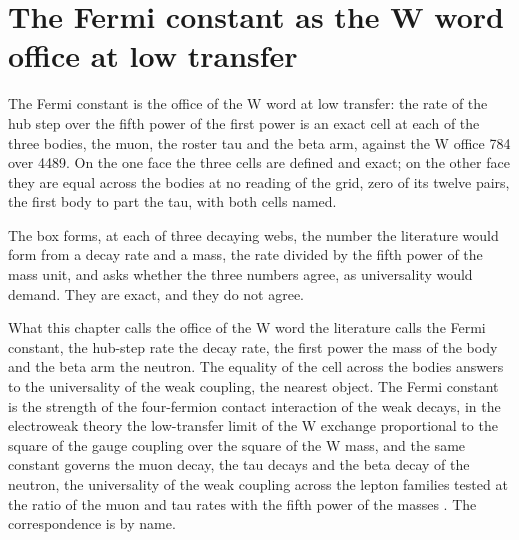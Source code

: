 \section{The Fermi constant as the W word office at low transfer}\label{mod:VI-5-D538919-w-fcwo}
\begin{chwall}
The Fermi constant is the office of the W word at low transfer: the rate of the hub step over the fifth power of the first power is an exact cell at each of the three bodies, the muon, the roster tau and the beta arm, against the W office 784 over 4489. On the one face the three cells are defined and exact; on the other face they are equal across the bodies at no reading of the grid, zero of its twelve pairs, the first body to part the tau, with both cells named.
\end{chwall}
\chdeps{}{}
The box forms, at each of three decaying webs, the number the literature would form from a decay rate and a mass, the rate divided by the fifth power of the mass unit, and asks whether the three numbers agree, as universality would demand. They are exact, and they do not agree.
\begin{chbridge}
What this chapter calls the office of the W word the literature calls the Fermi constant, the hub-step rate the decay rate, the first power the mass of the body and the beta arm the neutron. The equality of the cell across the bodies answers to the universality of the weak coupling, the nearest object. The Fermi constant is the strength of the four-fermion contact interaction of the weak decays, in the electroweak theory the low-transfer limit of the W exchange proportional to the square of the gauge coupling over the square of the W mass, and the same constant governs the muon decay, the tau decays and the beta decay of the neutron, the universality of the weak coupling across the lepton families tested at the ratio of the muon and tau rates with the fifth power of the masses \cite{Fermi1934,Michel1950,Weinberg1967}. The correspondence is by name.
\end{chbridge}
